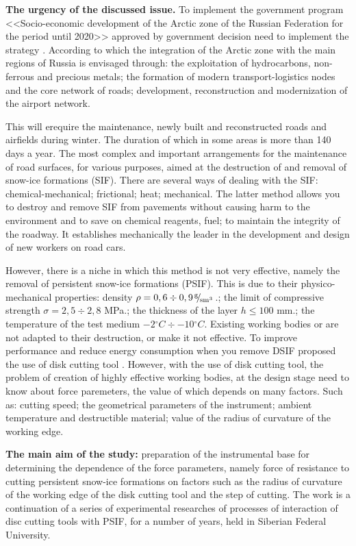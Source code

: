 \textbf{The urgency of the discussed issue.} To implement the government program <<Socio-economic development of the Arctic zone of the Russian Federation for the period until 2020>> approved by government decision \cite{PostRF} need to implement the strategy \cite{Strategi}. According to which the integration of the Arctic zone with the main regions of Russia is envisaged through: the exploitation of hydrocarbons, non-ferrous and precious metals; the formation of modern transport-logistics nodes and the core network of roads; development, reconstruction and modernization of the airport network.

This will erequire the maintenance, newly built and reconstructed roads and airfields during winter. The duration of which in some areas is more than 140 days a year. The most complex and important arrangements for the maintenance of road surfaces, for various purposes, aimed at the destruction of and removal of snow-ice formations (SIF). There are several ways of dealing with the SIF: chemical-mechanical; frictional; heat; mechanical. The latter method allows you to destroy and remove SIF from pavements without causing harm to the environment and to save on chemical reagents, fuel; to maintain the integrity of the roadway. It establishes mechanically the leader in the development and design of new workers on road cars.

However, there is a niche in which this method is not very effective, namely the removal of persistent snow-ice formations (PSIF). This is due to their physico-mechanical properties: density $\rho = 0,6 \div 0,9 \hspace{3pt}\!^{\text{g}}\!\!\hspace{1pt}/ \hspace{2pt}\!\!_{\text{sm}^3}\!\hspace{3pt}$.; the limit of compressive strength $\sigma = 2,5 \div 2,8$ MPa.; the thickness of the layer $h \le 100$ mm.; the temperature of the test medium $-2{}^\circ C\div-10{}^\circ C$. Existing working bodies or are not adapted to their destruction, or make it not effective. To improve performance and reduce energy consumption when you remove DSIF proposed the use of disk cutting tool \cite{GanjaDRI, GanjaPSLO, WorkOrgan}. However, with the use of disk cutting tool, the problem of creation of highly effective working bodies, at the design stage need to know about force paremeters, the value of which depends on many factors. Such as: cutting speed; the geometrical parameters of the instrument; ambient temperature and destructible material; value of the radius of curvature of the working edge. 

\textbf{The main aim of the study:} preparation of the instrumental base for determining the dependence of the force parameters, namely force of resistance to cutting persistent snow-ice formations on factors such as the radius of curvature of the working edge of the disk cutting tool and the step of cutting. The work is a continuation of a series of experimental researches of processes of interaction of disc cutting tools with PSIF, for a number of years, held in Siberian Federal University.

